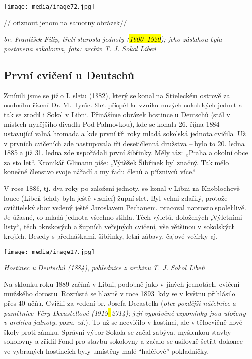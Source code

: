 \texttt{[image: media/image72.jpg]}

// oříznout jenom na samotný obrázek//

\emph{br. František Filip, třetí starosta jednoty (\hl{1900--⁠⁠⁠⁠⁠⁠1920});
jeho zásluhou byla postavena sokolovna, foto: archiv T. J. Sokol Libeň}

\subsection{První cvičení u
Deutschů}\label{prvnuxed-cviux10denuxed-u-deutschux16f}

Zmínili jsme se již o I. sletu (1882), který se konal na Střeleckém
ostrově za osobního řízení Dr. M. Tyrše. Slet přispěl ke vzniku nových
sokolských jednot a tak se zrodil i Sokol v Libni. Přinášíme obrázek
hostince u Deutschů (stál v místech nynějšího divadla Pod Palmovkou),
kde se konala 26. října 1884 ustavující valná hromada a kde první tři
roky mladá sokolská jednota cvičila. Už v prvních cvičeních zde
nastupovala tři desetičlenná družstva -- bylo to 20. ledna 1885 a již
31. ledna zde uspořádali první šibřinky. Měly ráz: „Praha a okolní obce
za sto let``. Kronikář Glimann píše: „Výtěžek Šibřinek byl značný. Tak
mělo konečně členstvo svoje nářadí a my řadu členů a příznivců více.``

V roce 1886, tj. dva roky po založení jednoty, se konal v Libni na
Knoblochově louce (Libeň tehdy byla ještě vesnicí) župní slet. Byl velmi
zdařilý, protože cvičitelský sbor vedený ještě Jaroslavem Pechanem,
pracoval naprosto spolehlivě. Je úžasné, co mladá jednota všechno
stihla. Těch výletů, doložených „Výletními listy``, těch okrskových a
župních veřejných cvičení, vše většinou v sokolských krojích. Besedy s
přednáškami, šibřinky, letní zábavy, čajové večírky aj.

\texttt{[image: media/image27.jpg]}

\emph{Hostinec u Deutschů (1884)}, \emph{pohlednice z archivu T. J.
Sokol Libeň}

Na sklonku roku 1889 začíná v Libni, podobně jako v jiných jednotách,
cvičení mužského dorostu. Rozrůstá se hlavně v roce 1893, kdy se v
květnu přihlásilo přes 40 učňů. Cvičili za vedení br. Josefa Decastella
(\emph{otce pozdější náčelnice a pamětnice Věry Decastellové
(1919\hl{--}2014); její vyprávěné vzpomínky jsou uloženy v archivu
jednoty, pozn. ed.}). To už se necvičilo v hostinci, ale v tělocvičně
nové školy proti zámku. Správní výbor Sokola se začal zabývat myšlenkou
stavby sokolovny a zřídil Fond pro stavbu sokolovny a začalo se usilovně
šetřit dokonce ve vybraných hostincích byly umístěny malé ``haléřové''
pokladničky.

